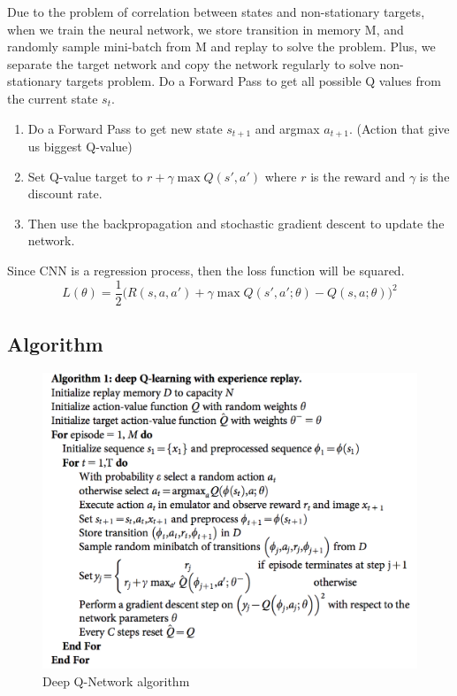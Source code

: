 Due to the problem of correlation between states and non-stationary targets, when we train the neural network, we store transition in memory M, and randomly sample mini-batch from M and replay to solve the problem. Plus, we separate the target network and copy the network regularly to solve non-stationary targets problem. Do a Forward Pass to get all possible Q values from the current state $s_t$.
\begin{enumerate}{}
\item Do a Forward Pass to get new state $s_{t+1}$ and argmax $a_{t+1}$. (Action that give us biggest Q-value)
\item Set Q-value target to $r+\gamma  \max Q(s',a')$ where $r$ is the reward and $\gamma$ is the discount rate.
\item Then use the backpropagation and stochastic gradient descent to update the network.
\end{enumerate}

Since CNN is a regression process, then the loss function will be squared.
$$L(\theta )=\frac{1}{2} \Big( R(s,a,a')+\gamma  \max Q(s',a';\theta)-Q(s,a;\theta) \Big)^2$$
\subsection{Algorithm}
\begin{figure}[H]
\begin{center}
\includegraphics[clip, width=1\textwidth]{Graphics/DQN.png} \caption{Deep Q-Network algorithm}
\end{center}
\end{figure}